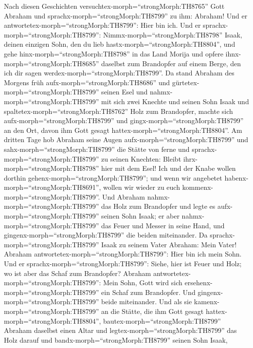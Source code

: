  Nach diesen Geschichten
versuchtex-morph=``strongMorph:TH8765'' Gott Abraham und
sprachx-morph=``strongMorph:TH8799'' zu ihm: Abraham! Und er
antwortetex-morph=``strongMorph:TH8799'': Hier bin ich.  Und
er sprachx-morph=``strongMorph:TH8799'':
Nimmx-morph=``strongMorph:TH8798'' Isaak, deinen einzigen Sohn, den du
lieb hastx-morph=``strongMorph:TH8804'', und gehe
hinx-morph=``strongMorph:TH8798'' in das Land Morija und opfere
ihnx-morph=``strongMorph:TH8685'' daselbst zum Brandopfer auf einem
Berge, den ich dir sagen werdex-morph=``strongMorph:TH8799''.
 Da stand Abraham des Morgens früh
aufx-morph=``strongMorph:TH8686'' und
gürtetex-morph=``strongMorph:TH8799'' seinen Esel und
nahmx-morph=``strongMorph:TH8799'' mit sich zwei Knechte und seinen Sohn
Isaak und spaltetex-morph=``strongMorph:TH8762'' Holz zum Brandopfer,
machte sich aufx-morph=``strongMorph:TH8799'' und
gingx-morph=``strongMorph:TH8799'' an den Ort, davon ihm Gott gesagt
hattex-morph=``strongMorph:TH8804''.  Am dritten Tage hob
Abraham seine Augen aufx-morph=``strongMorph:TH8799'' und
sahx-morph=``strongMorph:TH8799'' die Stätte von ferne  und
sprachx-morph=``strongMorph:TH8799'' zu seinen Knechten: Bleibt
ihrx-morph=``strongMorph:TH8798'' hier mit dem Esel! Ich und der Knabe
wollen dorthin gehenx-morph=``strongMorph:TH8799''; und wenn wir
angebetet habenx-morph=``strongMorph:TH8691'', wollen wir wieder zu euch
kommenx-morph=``strongMorph:TH8799''.  Und Abraham
nahmx-morph=``strongMorph:TH8799'' das Holz zum Brandopfer und legte es
aufx-morph=``strongMorph:TH8799'' seinen Sohn Isaak; er aber
nahmx-morph=``strongMorph:TH8799'' das Feuer und Messer in seine Hand,
und gingenx-morph=``strongMorph:TH8799'' die beiden miteinander.
 Da sprachx-morph=``strongMorph:TH8799'' Isaak zu seinem
Vater Abraham: Mein Vater! Abraham
antwortetex-morph=``strongMorph:TH8799'': Hier bin ich mein Sohn. Und er
sprachx-morph=``strongMorph:TH8799'': Siehe, hier ist Feuer und Holz; wo
ist aber das Schaf zum Brandopfer?  Abraham
antwortetex-morph=``strongMorph:TH8799'': Mein Sohn, Gott wird sich
ersehenx-morph=``strongMorph:TH8799'' ein Schaf zum Brandopfer. Und
gingenx-morph=``strongMorph:TH8799'' beide miteinander.  Und
als sie kamenx-morph=``strongMorph:TH8799'' an die Stätte, die ihm Gott
gesagt hattex-morph=``strongMorph:TH8804'',
bautex-morph=``strongMorph:TH8799'' Abraham daselbst einen Altar und
legtex-morph=``strongMorph:TH8799'' das Holz darauf und
bandx-morph=``strongMorph:TH8799'' seinen Sohn Isaak,
